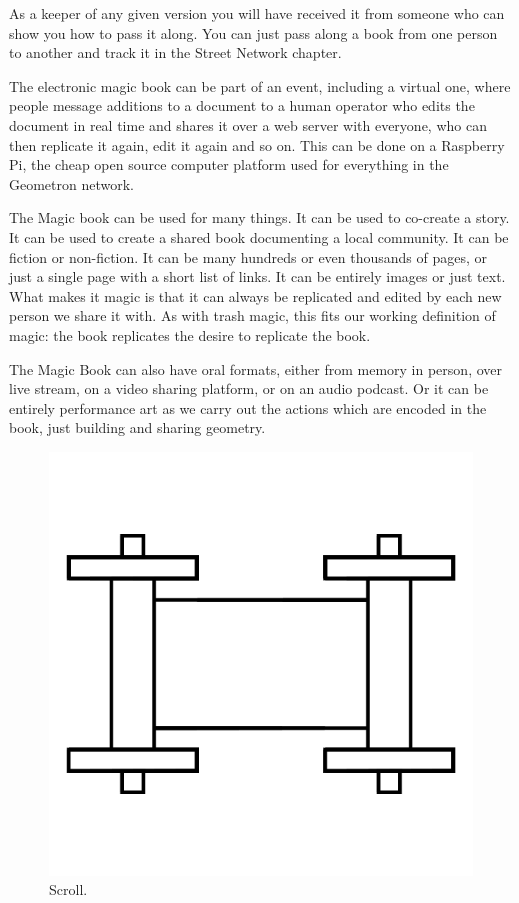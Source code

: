 \documentclass{report}
\begin{document}
As a keeper of any given version you will have received it from someone who can show you how to pass it along.  You can just pass along a book from one person to another and track it in the Street Network chapter. 

The electronic magic book can be part of an event, including a virtual one, where people message additions to a document to a human operator who edits the document in real time and shares it over a web server with everyone, who can then replicate it again, edit it again and so on.  This can be done on a Raspberry Pi, the cheap open source computer platform used for everything in the Geometron network. 

The Magic book can be used for many things. It can be used to co-create a story.  It can be used to create a shared book documenting a local community. It can be fiction or non-fiction.  It can be many hundreds or even thousands of pages, or just a single page with a short list of links.  It can be entirely images or just text.  What makes it magic is that it can always be replicated and edited by each new person we share it with.  As with trash magic, this fits our working definition of magic: the book replicates the desire to replicate the book.  

The Magic Book can also have oral formats, either from memory in person, over live stream, on a video sharing platform, or on an audio podcast.  Or it can be entirely performance art as we carry out the actions which are encoded in the book, just building and sharing geometry. 

\begin{figure}
	\centering
	\includegraphics[width=5in]{imageserver/uploadimages/image16.png}
	\caption{Scroll.}
\end{figure}
\end{document}
